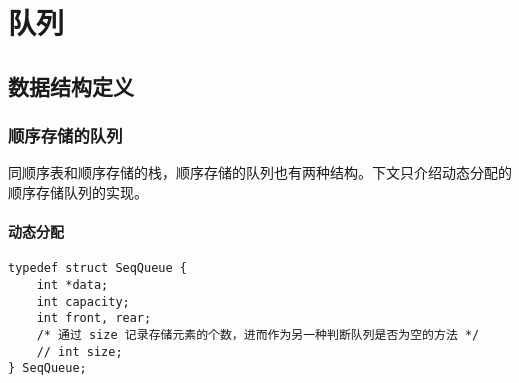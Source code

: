 \documentclass{ctexart}
\begin{document}
\section{队列}
\subsection{数据结构定义}
\subsubsection{顺序存储的队列}
同顺序表和顺序存储的栈，顺序存储的队列也有两种结构。下文只介绍动态分配的顺序存储队列的实现。
\paragraph{动态分配}
\begin{verbatim}
typedef struct SeqQueue {
    int *data;
    int capacity;
    int front, rear;
    /* 通过 size 记录存储元素的个数，进而作为另一种判断队列是否为空的方法 */
    // int size;
} SeqQueue;
\end{verbatim}
\end{document}
